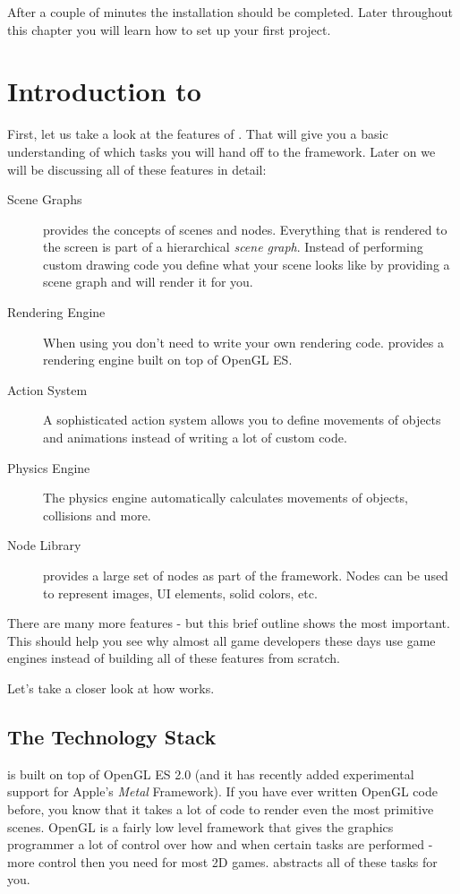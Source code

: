 After a couple of minutes the \SB{} installation should be completed. Later
throughout this chapter you will learn how to set up your first project.

\section{Introduction to \cocos{}}
First, let us take a look at the features of \cocos{}. That will give you a
basic understanding of which tasks you will hand off to the framework. Later on
we will be discussing all of these features in detail:
\begin{description}
  \item[Scene Graphs] \cocos{} provides the concepts of scenes and nodes.
  Everything that is rendered to the screen is part of a hierarchical
  \textit{scene graph}. Instead of performing custom drawing code you define
  what your scene looks like by providing a scene graph and \cocos{} will render
  it for you.
  \item[Rendering Engine] When using \cocos{} you don't need to write your own
  rendering code. \cocos{} provides a rendering engine built on top of OpenGL
  ES.
  \item[Action System] A sophisticated action system allows you to define
  movements of objects and animations instead of writing a lot of custom code.
  \item[Physics Engine] The \cocos{} physics engine automatically
  calculates movements of objects, collisions and more.
  \item[Node Library] \cocos{} provides a large set of nodes as part of the
  framework. Nodes can be used to represent images, UI elements, solid colors,
  etc.
\end{description}

There are many more features - but this brief outline shows the most
important. This should help you see why almost all game developers these
days use game engines instead of building all of these features from scratch.
 
Let's take a closer look at how \cocos{} works.

\subsection{The \cocos{} Technology Stack}

\cocos{} is built on top of OpenGL ES 2.0 (and it has recently added
experimental support for Apple's \textit{Metal} Framework).
If you have ever written OpenGL code before, you know that it takes a lot of
code to render even the most primitive scenes.	OpenGL is a fairly low level
framework that gives the graphics programmer a lot of control over how and when certain tasks are performed -
more control then you need for most 2D games. \cocos{} abstracts all of these
tasks for you. 

